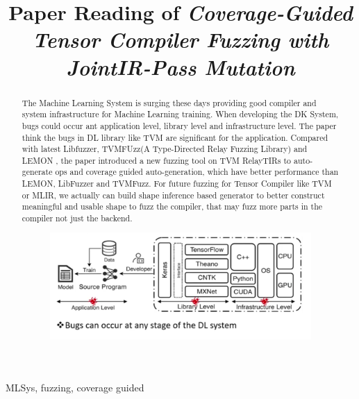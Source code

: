 \documentclass[conference]{IEEEtran}
\begin{document}
\title{Paper Reading of \textit{Coverage-Guided Tensor Compiler Fuzzing with JointIR-Pass Mutation}}

\author{
}

\maketitle

\begin{abstract}
    The Machine Learning System is surging these days providing good compiler and system infrastructure for Machine Learning training. When developing the DK System, bugs could occur ant application level, library level and infrastructure level. The paper think the bugs in DL library like TVM are significant for the application. Compared with latest Libfuzzer, TVMFUzz(A Type-Directed Relay Fuzzing Library) \cite{b3} and LEMON \cite{b2}, the paper introduced a new fuzzing tool on TVM RelayTIRs to auto-generate ops and coverage guided auto-generation, which have better performance than LEMON, LibFuzzer and TVMFuzz. For future fuzzing for Tensor Compiler like TVM or MLIR, we actually can build shape inference based generator to better construct meaningful and usable shape to fuzz the compiler, that may fuzz more parts in the compiler not just the backend.

    \begin{figure}[htbp]
        \centering
        \includegraphics[width=\columnwidth]{./lemon.png}
        \caption{}
    \end{figure}
\end{abstract}

\begin{IEEEkeywords}
    MLSys, fuzzing, coverage guided
\end{IEEEkeywords}
\end{document}
